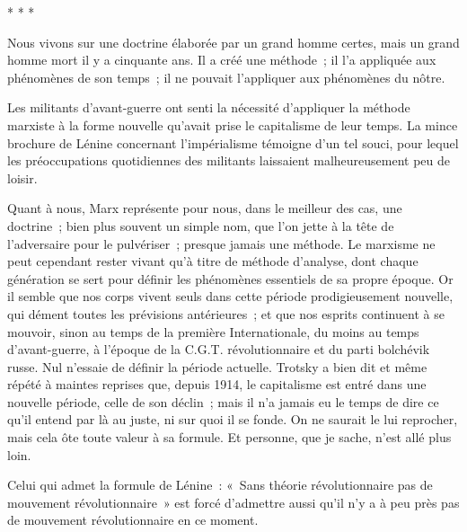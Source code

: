 \documentclass[french,twoside]{book} %
\begin{document}
\begin{center}
* * *\end{center}
\noindent Nous vivons sur une doctrine élaborée par un grand homme certes, mais un grand homme mort il y a cinquante ans. Il a créé une méthode ; il l'a appliquée aux phénomènes de son temps ; il ne pouvait l'appliquer aux phénomènes du nôtre.\par
Les militants d'avant-guerre ont senti la nécessité d'appliquer la méthode marxiste à la forme nouvelle qu'avait prise le capitalisme de leur temps. La mince brochure de Lénine concernant l'impérialisme témoigne d'un tel souci, pour lequel les préoccupations quotidiennes des militants laissaient malheureusement peu de loisir.\par
Quant à nous, Marx représente pour nous, dans le meilleur des cas, une doctrine ; bien plus souvent un simple nom, que l'on jette à la tête de l'adversaire pour le pulvériser ; presque jamais une méthode. Le marxisme ne peut cependant rester vivant qu'à titre de méthode d'analyse, dont chaque génération se sert pour définir les phénomènes essentiels de sa propre époque. Or il semble que nos corps vivent seuls dans cette période prodigieusement nouvelle, qui dément toutes les prévisions antérieures ; et que nos esprits continuent à se mouvoir, sinon au temps de la première Internationale, du moins au temps d'avant-guerre, à l'époque de la C.G.T. révolutionnaire et du parti bolchévik russe. Nul n'essaie de définir la période actuelle. Trotsky a bien dit et même répété à maintes reprises que, depuis 1914, le capitalisme est entré dans une nouvelle période, celle de son déclin ; mais il n'a jamais eu le temps de dire ce qu'il entend par là au juste, ni sur quoi il se fonde. On ne saurait le lui reprocher, mais cela ôte toute valeur à sa formule. Et personne, que je sache, n'est allé plus loin.\par
Celui qui admet la formule de Lénine : « Sans théorie révolutionnaire pas de mouvement révolutionnaire » est forcé d'admettre aussi qu'il n'y a à peu près pas de mouvement révolutionnaire en ce moment.\par
\end{document}
